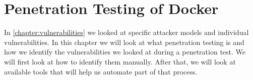 \chapter{Penetration Testing of Docker}\label{chapter:pentesting}
In \autoref{chapter:vulnerabilities} we looked at specific attacker models and individual vulnerabilities. In this chapter we will look at what penetration testing is and how we identify the vulnerabilities we looked at during a penetration test. We will first look at how to identify them manually. After that, we will look at available tools that will help us automate part of that process.




